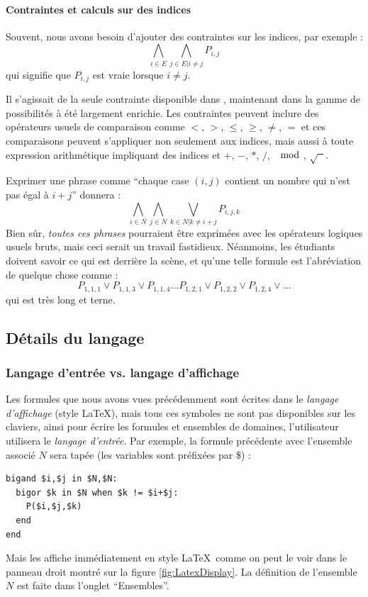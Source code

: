 \paragraph{Contraintes et calculs sur des indices}

Souvent, nous avons besoin d'ajouter des contraintes sur les indices, par exemple :
$$\bigwedge_{i \in E } \bigwedge_{j \in E  | i \neq j}P_{i,j}$$
qui signifie que $P_{i,j}$ est vraie lorsque $i\neq j$. 

Il s'agissait de la seule contrainte disponible dans \satoulouse, maintenant dans \touist la gamme de possibilités à été largement enrichie. Les contraintes peuvent inclure des opérateurs usuels de comparaison comme $<$, $>$, $\leq$, $\geq$, $\neq$, $=$ et ces comparaisons peuvent s'appliquer non seulement aux indices, mais aussi à toute expression arithmétique impliquant des indices et $+$, $-$, $*$, $/$, $\mod$, $\sqrt{\phantom{x}}$. 

Exprimer une phrase comme \enquote{chaque case $(i,j)$ contient un nombre qui n'est pas égal à $i+j$} donnera :
$$\bigwedge_{i \in N } \bigwedge_{j \in N} \bigvee_{k \in N|k\neq i+j} P_{i,j,k}$$
Bien s\^ur, \emph{toutes ces phrases} pourraient être exprimées avec les opérateurs logiques usuels bruts, mais ceci serait un travail fastidieux. Néanmoins, les étudiants doivent savoir ce qui est derrière la scène, et qu'une telle formule est l'abréviation de quelque chose comme :
$$P_{1,1,1}\vee P_{1,1,3}\vee P_{1,1,4}\ldots P_{1,2,1}\vee P_{1,2,2}\vee P_{1,2,4}\vee \ldots $$
qui est très long et terne.



\subsection{Détails du langage}

\subsubsection{Langage d'entrée vs. langage d'affichage}

Les formules que nous avons vues précédemment sont écrites dans le \emph{langage d'affichage} (style \LaTeX), mais tous ces symboles ne sont pas disponibles sur les claviers, ainsi pour écrire les formules et ensembles de domaines, l'utilisateur utilisera le \emph{langage d'entrée}.
Par exemple, la formule précédente avec l'ensemble associé $N$ sera tapée (les variables sont préfixées par \$) :
\begin{verbatim}
bigand $i,$j in $N,$N:
  bigor $k in $N when $k != $i+$j:
    P($i,$j,$k)
  end
end
\end{verbatim}
Mais \touist les affiche immédiatement en style \LaTeX\ comme on peut le voir dans le panneau droit montré sur la figure \ref{fig:LatexDisplay}.
La définition de l'ensemble $N$ est faite dans l'onglet \enquote{Ensembles}.

